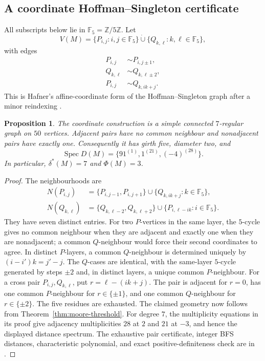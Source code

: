 \documentclass[a4paper,10pt,reqno]{amsart}
\theoremstyle{plain}
\newtheorem{proposition}[theorem]{Proposition}
\theoremstyle{definition}
\theoremstyle{remark}
\newcommand{\F}{\mathbb F_5}
\newcommand{\Spec}{\operatorname{Spec}}
\newcommand{\RepoTag}{v2.2.8}
\newcommand{\codefile}[1]{%
  \href{https://github.com/SamPetkov/wow284/blob/\RepoTag/#1}{\path{#1}}}
\begin{document}
\subsection{A coordinate Hoffman--Singleton certificate}

All subscripts below lie in \(\F=\mathbb Z/5\mathbb Z\).  Let
\[
 V(M)=\{P_{i,j}:i,j\in\F\}\mathbin{\dot\cup}
      \{Q_{k,\ell}:k,\ell\in\F\},
\]
with edges
\begin{align*}
 P_{i,j}&\sim P_{i,j\pm1},\\
 Q_{k,\ell}&\sim Q_{k,\ell\pm2},\\
 P_{i,j}&\sim Q_{k,ik+j}.
\end{align*}
This is Hafner's affine-coordinate form of the Hoffman--Singleton graph after a
minor reindexing \cite{Hafner2003}.

\begin{proposition}\label{prop:hs-coordinate}
The coordinate construction is a simple connected \(7\)-regular graph on
\(50\) vertices.  Adjacent pairs have no common neighbour and nonadjacent pairs
have exactly one.  Consequently it has girth five, diameter two, and
\[
 \Spec D(M)=\{91^{(1)},1^{(21)},(-4)^{(28)}\}.
\]
In particular, \(\delta^*(M)=7\) and \(\Phi(M)=3\).
\end{proposition}

\begin{proof}
The neighbourhoods are
\begin{align*}
N(P_{i,j})&=\{P_{i,j-1},P_{i,j+1}\}
 \cup\{Q_{k,ik+j}:k\in\F\},\\
N(Q_{k,\ell})&=\{Q_{k,\ell-2},Q_{k,\ell+2}\}
 \cup\{P_{i,\ell-ik}:i\in\F\}.
\end{align*}
They have seven distinct entries.  For two \(P\)-vertices in the same layer,
the \(5\)-cycle gives no common neighbour when they are adjacent and exactly
one when they are nonadjacent; a common \(Q\)-neighbour would force their
second coordinates to agree.  In distinct \(P\)-layers, a common
\(Q\)-neighbour is determined uniquely by
\((i-i')k=j'-j\).  The \(Q\)-cases are identical, with the same-layer
\(5\)-cycle generated by steps \(\pm2\) and, in distinct layers, a unique
common \(P\)-neighbour.  For a cross pair \(P_{i,j},Q_{k,\ell}\), put
\(r=\ell-(ik+j)\).  The pair is adjacent for \(r=0\), has one common
\(P\)-neighbour for \(r\in\{\pm1\}\), and one common \(Q\)-neighbour for
\(r\in\{\pm2\}\).  The five residues are exhausted.  The claimed geometry
now follows from Theorem~\ref{thm:moore-threshold}.  For degree \(7\), the
multiplicity equations in its proof give adjacency multiplicities \(28\) at
\(2\) and \(21\) at \(-3\), and hence the displayed distance spectrum.  The exhaustive
pair certificate, integer BFS distances, characteristic polynomial, and exact
positive-definiteness check are in \codefile{scripts/verify_exact.py}.
\end{proof}
\end{document}
